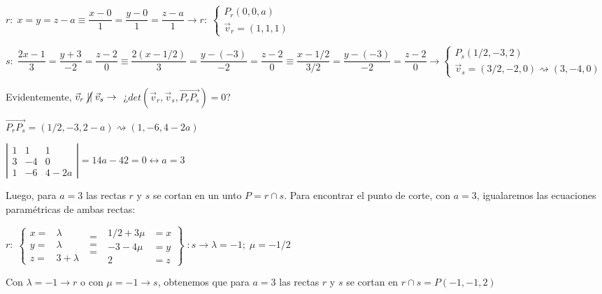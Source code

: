 \begin{proofw}\renewcommand{\qedsymbol}{$\diamond$}
	$r:\; x=y=z-a \equiv \dfrac{x-0}{1}=\dfrac{y-0}{1}=\dfrac{z-a}{1} \to r:\;\begin{cases} P_r(0,0,a) \\ \vec v_r=(1,1,1) \end{cases}$ 
	
\noindent $s:\; \dfrac{2x-1}{3}=\dfrac{y+3}{-2}=\dfrac{z-2}{0} \equiv \dfrac{2(x-1/2)}{3}=\dfrac{y-(-3)}{-2}=\dfrac{z-2}{0} \equiv \dfrac{x-1/2}{3/2}=\dfrac{y-(-3)}{-2}=\dfrac{z-2}{0} \to \begin{cases} P_s(1/2,-3,2) \\ \vec v_s=(3/2,-2,0)\rightsquigarrow (3,-4,0)  \end{cases}$

\noindent Evidentemente, $\vec v_r \;\cancel{||}\; \vec v_s \to \;$ ¿$det(\vec v_r, \vec v_s, \overrightarrow{P_rP_s}) = 0$? 

\noindent $\overrightarrow{P_rP_s}=(1/2,-3,2-a) \rightsquigarrow  (1,-6,4-2a)$

\noindent $\left| \begin{matrix} 1&1&1 \\ 3&-4&0 \\ 1&-6&4-2a \end{matrix} \right|= 14a-42=0 \leftrightarrow a=3$

Luego, para $a=3$ las rectas $r$ y $s$ se cortan en un unto $P=r\cap s$. Para encontrar el punto de corte, con $a=3$, igualaremos las ecuaciones paramétricas de ambas rectas:

\noindent $r:\;
\left\{
\begin{matrix}
x= &\lambda \\ y= &\lambda \\ z= &3+\lambda	
\end{matrix}
\right.
\begin{matrix}
\boldsymbol{\;=\;}\\\boldsymbol{\;=\;}\\\boldsymbol{\;=\;}	
\end{matrix}
\left.
\begin{matrix}
1/2+3\mu &=x \\ -3-4\mu &=y \\ 2 &=z	
\end{matrix}
\right\}
\;:s \longrightarrow \lambda=-1; \; \mu=-1/2$

\noindent Con $\lambda=-1 \to r$ o con $\mu=-1 \to s$, obtenemos que para $a=3$ las rectas $r$ y $s$ se cortan en $r\cap s=P(-1,-1,2)$



\noindent 

\end{proofw}

